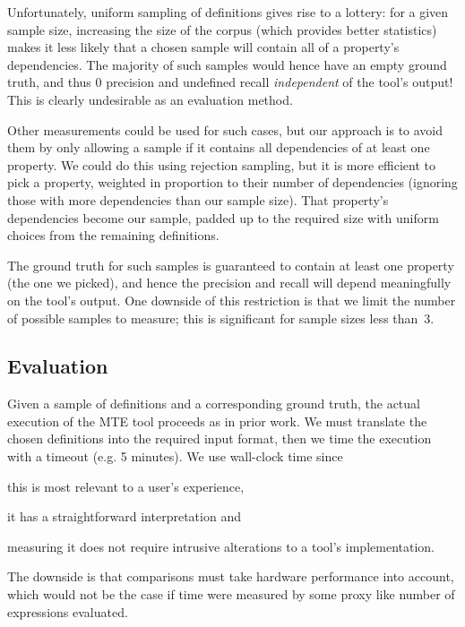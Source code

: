 Unfortunately, uniform sampling of definitions gives rise to a lottery: for a
given sample size, increasing the size of the corpus (which provides better
statistics) makes it less likely that a chosen sample will contain all of
a property's dependencies. The majority of such samples would hence have an
empty ground truth, and thus $0$ precision and undefined recall
\emph{independent} of the tool's output! This is clearly undesirable as an
evaluation method.

Other measurements could be used for such cases, but our approach is to avoid
them by only allowing a sample if it contains all dependencies of at least one
property. We could do this using rejection sampling, but it is more efficient to
pick a property, weighted in proportion to their number of dependencies
(ignoring those with more dependencies than our sample size). That property's
dependencies become our sample, padded up to the required size with uniform
choices from the remaining definitions.

The ground truth for such samples is guaranteed to contain at least one property
(the one we picked), and hence the precision and recall will depend meaningfully
on the tool's output. One downside of this restriction is that we limit the
number of possible samples to measure; this is significant for sample sizes less
than~3.

\subsection{Evaluation}
\label{section:evaluation}

Given a sample of definitions and a corresponding ground truth, the actual
execution of the MTE tool proceeds as in prior work. We must translate the
chosen definitions into the required input format, then we time the execution
with a timeout (e.g. 5 minutes). We use wall-clock time since
\begin {enumerate*} [i) ]%
\item this is most relevant to a user's experience,
\item it has a straightforward interpretation and
\item measuring it does not require intrusive alterations to a tool's
  implementation.
\end {enumerate*}
The downside is that comparisons must take hardware performance into account,
which would not be the case if time were measured by some proxy like number of
expressions evaluated.

